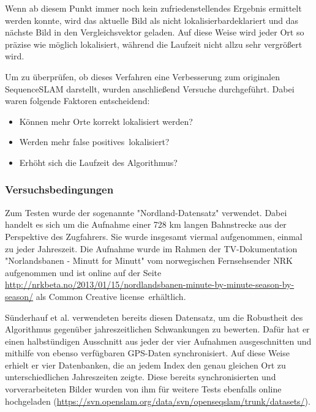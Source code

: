 \documentclass[12pt,a4paper,titlepage]{scrartcl}
\begin{document}
Wenn ab diesem Punkt immer noch kein zufriedenstellendes Ergebnis ermittelt werden konnte, wird das aktuelle Bild als \glqq nicht lokalisierbar\grqq{ }deklariert und das nächste Bild in den Vergleichsvektor geladen. Auf diese Weise wird jeder Ort so präzise wie möglich lokalisiert, während die Laufzeit nicht allzu sehr vergrößert wird.

Um zu überprüfen, ob dieses Verfahren eine Verbesserung zum originalen SequenceSLAM darstellt, wurden anschließend Versuche durchgeführt. Dabei waren folgende Faktoren entscheidend:
\begin{itemize}
\item Können mehr Orte korrekt lokalisiert werden?
\item Werden mehr \glqq false positives\grqq~lokalisiert?
\item Erhöht sich die Laufzeit des Algorithmus?
\end{itemize}
\subsubsection{Versuchsbedingungen}
Zum Testen wurde der sogenannte "Nordland-Datensatz" verwendet. Dabei handelt es sich um die Aufnahme einer 728 km langen Bahnstrecke aus der Perspektive des Zugfahrers. Sie wurde insgesamt viermal aufgenommen, einmal zu jeder Jahreszeit. Die Aufnahme wurde im Rahmen der TV-Dokumentation "Norlandsbanen - Minutt for Minutt" vom norwegischen Fernsehsender NRK aufgenommen und ist online auf der Seite \url{http://nrkbeta.no/2013/01/15/nordlandsbanen-minute-by-minute-season-by-season/} als \glqq Common Creative license\grqq~erhältlich. 

Sünderhauf et al. verwendeten bereits diesen Datensatz, um die Robustheit des Algorithmus gegenüber jahreszeitlichen Schwankungen zu bewerten. Dafür hat er einen halbstündigen Ausschnitt aus jeder der vier Aufnahmen ausgeschnitten und mithilfe von ebenso verfügbaren GPS-Daten synchronisiert. Auf diese Weise erhielt er vier Datenbanken, die an jedem Index den genau gleichen Ort zu unterschiedlichen Jahreszeiten zeigte. Diese bereits synchronisierten und vorverarbeiteten Bilder wurden von ihm für weitere Tests ebenfalls online hochgeladen (\url{https://svn.openslam.org/data/svn/openseqslam/trunk/datasets/}).
\end{document}
